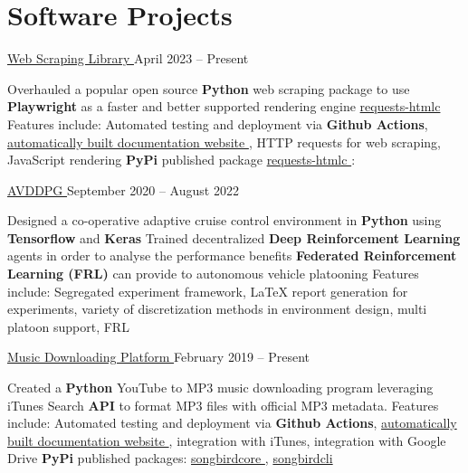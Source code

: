 \section{Software Projects}
\begin{subheading}
	\resumeProject
	{\href{https://github.com/cboin1996/requests-html}{Web Scraping Library \footnotesize{\faExternalLink}}} %
	{April 2023 -- Present} %
	\begin{entries}
        \ib Overhauled a popular open source \textbf{Python} web scraping package
        to use \textbf{Playwright} as a faster and better
        supported rendering engine
        \href{https://pypi.org/project/requests-htmlc/}{requests-htmlc \faExternalLink} 
        \ib Features include: Automated testing and deployment via \textbf{Github Actions}, \href{https://cboin1996.github.io/requests-html/latest/}{automatically built documentation website \faExternalLink},
        HTTP requests for web scraping, JavaScript rendering
        \ib \textbf{PyPi} published package \href{https://pypi.org/project/requests-htmlc/}{requests-htmlc \faExternalLink}:
	\end{entries}
	\resumeProject
	{\href{https://github.com/\github/avddpg}{AVDDPG \footnotesize{\faExternalLink}}}
	{September 2020 -- August 2022} %
	\begin{entries}
		\ib Designed a co-operative adaptive cruise control environment in \textbf{Python} using \textbf{Tensorflow} and
		\textbf{Keras}
		\ib Trained decentralized \textbf{Deep Reinforcement Learning} agents in order to analyse the performance benefits \textbf{Federated Reinforcement Learning (FRL)}
		can provide to autonomous vehicle platooning
		\ib Features include: Segregated experiment framework, \LaTeX \hspace{0.5pt} report generation for experiments,
		variety of discretization methods in environment design, multi platoon support, FRL
	\end{entries}

	\resumeProject
	{\href{https://github.com/cboin1996/songbird}{Music Downloading Platform \footnotesize{\faExternalLink}}} %
	{February 2019 -- Present} %
	\begin{entries}
		\ib Created a \textbf{Python} YouTube to MP3 music downloading program leveraging iTunes Search \textbf{API} to format
        MP3 files with official MP3 metadata.
        \ib Features include: Automated testing and deployment via \textbf{Github Actions}, \href{https://cboin1996.github.io/songbird/latest/}{automatically built documentation website \faExternalLink}, integration with iTunes,
        integration with Google Drive
        \ib \textbf{PyPi} published packages: \href{https://pypi.org/project/songbirdcore/}{songbirdcore \faExternalLink}, \href{https://pypi.org/project/songbirdcli/}{songbirdcli \faExternalLink}
	\end{entries}

\end{subheading}
